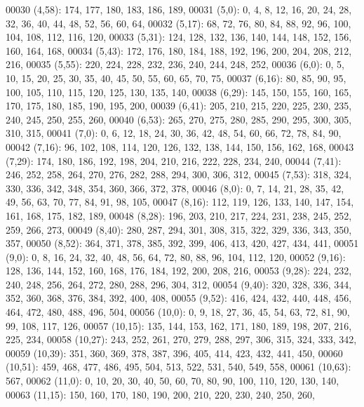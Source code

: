\begin{DoxyCode}
00030       (4,58): 174, 177, 180, 183, 186, 189,
00031       (5,0): 0, 4, 8, 12, 16, 20, 24, 28, 32, 36, 40, 44, 48, 52, 56, 60, 64,
00032       (5,17): 68, 72, 76, 80, 84, 88, 92, 96, 100, 104, 108, 112, 116, 120,
00033       (5,31): 124, 128, 132, 136, 140, 144, 148, 152, 156, 160, 164, 168,
00034       (5,43): 172, 176, 180, 184, 188, 192, 196, 200, 204, 208, 212, 216,
00035       (5,55): 220, 224, 228, 232, 236, 240, 244, 248, 252,
00036       (6,0): 0, 5, 10, 15, 20, 25, 30, 35, 40, 45, 50, 55, 60, 65, 70, 75,
00037       (6,16): 80, 85, 90, 95, 100, 105, 110, 115, 120, 125, 130, 135, 140,
00038       (6,29): 145, 150, 155, 160, 165, 170, 175, 180, 185, 190, 195, 200,
00039       (6,41): 205, 210, 215, 220, 225, 230, 235, 240, 245, 250, 255, 260,
00040       (6,53): 265, 270, 275, 280, 285, 290, 295, 300, 305, 310, 315,
00041       (7,0): 0, 6, 12, 18, 24, 30, 36, 42, 48, 54, 60, 66, 72, 78, 84, 90,
00042       (7,16): 96, 102, 108, 114, 120, 126, 132, 138, 144, 150, 156, 162, 168,
00043       (7,29): 174, 180, 186, 192, 198, 204, 210, 216, 222, 228, 234, 240,
00044       (7,41): 246, 252, 258, 264, 270, 276, 282, 288, 294, 300, 306, 312,
00045       (7,53): 318, 324, 330, 336, 342, 348, 354, 360, 366, 372, 378,
00046       (8,0): 0, 7, 14, 21, 28, 35, 42, 49, 56, 63, 70, 77, 84, 91, 98, 105,
00047       (8,16): 112, 119, 126, 133, 140, 147, 154, 161, 168, 175, 182, 189,
00048       (8,28): 196, 203, 210, 217, 224, 231, 238, 245, 252, 259, 266, 273,
00049       (8,40): 280, 287, 294, 301, 308, 315, 322, 329, 336, 343, 350, 357,
00050       (8,52): 364, 371, 378, 385, 392, 399, 406, 413, 420, 427, 434, 441,
00051       (9,0): 0, 8, 16, 24, 32, 40, 48, 56, 64, 72, 80, 88, 96, 104, 112, 120,
00052       (9,16): 128, 136, 144, 152, 160, 168, 176, 184, 192, 200, 208, 216,
00053       (9,28): 224, 232, 240, 248, 256, 264, 272, 280, 288, 296, 304, 312,
00054       (9,40): 320, 328, 336, 344, 352, 360, 368, 376, 384, 392, 400, 408,
00055       (9,52): 416, 424, 432, 440, 448, 456, 464, 472, 480, 488, 496, 504,
00056       (10,0): 0, 9, 18, 27, 36, 45, 54, 63, 72, 81, 90, 99, 108, 117, 126,
00057       (10,15): 135, 144, 153, 162, 171, 180, 189, 198, 207, 216, 225, 234,
00058       (10,27): 243, 252, 261, 270, 279, 288, 297, 306, 315, 324, 333, 342,
00059       (10,39): 351, 360, 369, 378, 387, 396, 405, 414, 423, 432, 441, 450,
00060       (10,51): 459, 468, 477, 486, 495, 504, 513, 522, 531, 540, 549, 558,
00061       (10,63): 567,
00062       (11,0): 0, 10, 20, 30, 40, 50, 60, 70, 80, 90, 100, 110, 120, 130, 140,
00063       (11,15): 150, 160, 170, 180, 190, 200, 210, 220, 230, 240, 250, 260,

\end{DoxyCode}
